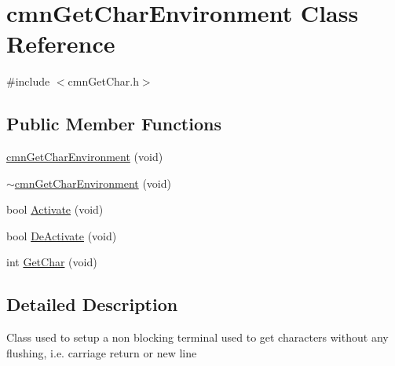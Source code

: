 \hypertarget{classcmn_get_char_environment}{\section{cmn\-Get\-Char\-Environment Class Reference}
\label{classcmn_get_char_environment}
}


{\ttfamily \#include $<$cmn\-Get\-Char.\-h$>$}

\subsection*{Public Member Functions}
\begin{DoxyCompactItemize}
\item 
\hyperlink{classcmn_get_char_environment_a951bc89ff0713859a6548ab97106ed4f}{cmn\-Get\-Char\-Environment} (void)
\item 
\hyperlink{classcmn_get_char_environment_a1fa4ed0d43ea4af15529823f1c5df363}{$\sim$cmn\-Get\-Char\-Environment} (void)
\item 
bool \hyperlink{classcmn_get_char_environment_abb820044ffa1dcaf0519d9d8579e2b03}{Activate} (void)
\item 
bool \hyperlink{classcmn_get_char_environment_a18949b557a5c1c74b8b10bf90fe3a8d1}{De\-Activate} (void)
\item 
int \hyperlink{classcmn_get_char_environment_a87cdc91fcaf5144c864e744474f30dde}{Get\-Char} (void)
\end{DoxyCompactItemize}


\subsection{Detailed Description}
Class used to setup a non blocking terminal used to get characters without any flushing, i.\-e. carriage return or new line 


